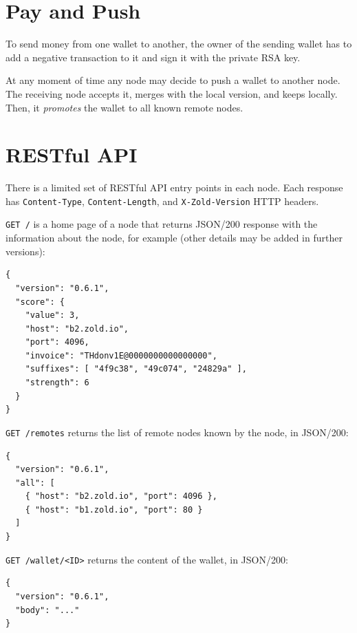 \documentclass[11pt,oneside]{article}
\newcommand\dd[1]{\colorbox{gray!30}{\texttt{#1}}}
\begin{document}
\section{Pay and Push}

To send money from one wallet to another, the owner of the sending wallet
has to add a negative transaction to it and sign it with the private RSA key.

At any moment of time any node may decide to push a wallet to another node.
The receiving node accepts it, merges with the local version, and keeps locally.
Then, it \emph{promotes} the wallet to all known remote nodes.

\section{RESTful API}

There is a limited set of RESTful API entry points in each node.
Each response has \dd{Content-Type},
\dd{Content-Length}, and \dd{X-Zold-Version}
HTTP headers.

\dd{GET /} is a home page of a node that returns JSON/200 response with the
information about the node, for example (other details may be added in
further versions):

\begin{verbatim}
{
  "version": "0.6.1",
  "score": {
    "value": 3,
    "host": "b2.zold.io",
    "port": 4096,
    "invoice": "THdonv1E@0000000000000000",
    "suffixes": [ "4f9c38", "49c074", "24829a" ],
    "strength": 6
  }
}
\end{verbatim}

\dd{GET /remotes} returns the list of remote nodes known by the node,
in JSON/200:

\begin{verbatim}
{
  "version": "0.6.1",
  "all": [
    { "host": "b2.zold.io", "port": 4096 },
    { "host": "b1.zold.io", "port": 80 }
  ]
}\end{verbatim}

\dd{GET /wallet/<ID>} returns the content of the wallet, in JSON/200:

\begin{verbatim}
{
  "version": "0.6.1",
  "body": "..."
}\end{verbatim}
\end{document}

